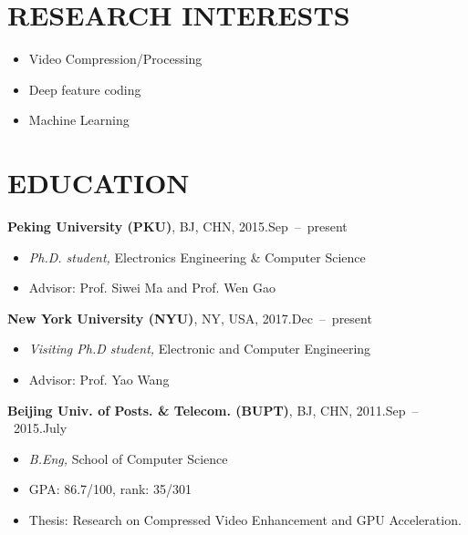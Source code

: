\documentclass[margin, 10pt]{res} %
\begin{document}
\begin{resume}


\section{RESEARCH INTERESTS}

\begin{itemize} \itemsep -2pt %
\item{Video Compression/Processing}
\item{Deep feature coding}
\item{Machine Learning}
\end{itemize}


\section{EDUCATION}
{\bf Peking University (PKU)}, BJ, CHN, \hfill{ 2015.Sep~--~present}
\begin{itemize} \itemsep -1pt
\item{{\sl Ph.D. student,} Electronics Engineering \& Computer Science}
\item{Advisor: Prof. Siwei Ma and Prof. Wen Gao}
\end{itemize}
{\bf New York University (NYU)}, NY, USA, \hfill{ 2017.Dec~--~present}
\begin{itemize} \itemsep -1pt
\item{{\sl Visiting Ph.D student,} Electronic and Computer Engineering}
\item{Advisor: Prof. Yao Wang}
\end{itemize}
{\bf Beijing Univ. of Posts. \& Telecom. (BUPT)}, BJ, CHN, \hfill{ 2011.Sep~--~2015.July}
\begin{itemize} \itemsep -1pt
\item{{\sl B.Eng,} School of Computer Science}
\item{GPA: 86.7/100, rank: 35/301}
\item{Thesis: Research on Compressed Video Enhancement and GPU Acceleration.}
\end{itemize}



\end{resume}
\end{document}
